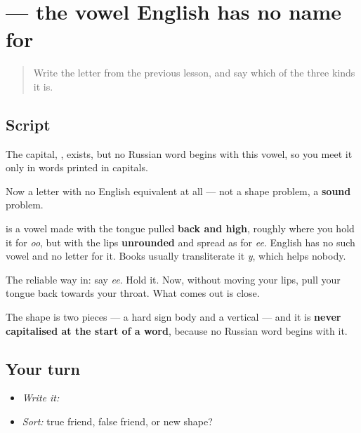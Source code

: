\section[\texorpdfstring{\ru{ы} (y)}{ы (y)}]{ — the vowel English has no name for}

\label{lesson:RU-W06-y}



\begin{quote}
Write the letter from the previous lesson, and say which of the three kinds it is.
\end{quote}

\subsection*{Script}

\begin{quote}
   
\end{quote}

The capital, \textbf{}, exists, but no Russian word begins with this vowel, so you meet it only in words printed in capitals.

Now a letter with no English equivalent at all — not a shape problem, a \textbf{sound} problem.

\textbf{} is a vowel made with the tongue pulled \textbf{back and high}, roughly where you hold it for \emph{oo}, but with the lips \textbf{unrounded} and spread as for \emph{ee}. English has no such vowel and no letter for it. Books usually transliterate it \emph{y}, which helps nobody.

The reliable way in: say \emph{ee}. Hold it. Now, without moving your lips, pull your tongue back towards your throat. What comes out is close.

The shape is two pieces — a hard sign body and a vertical — and it is \textbf{never capitalised at the start of a word}, because no Russian word begins with it.

\subsection*{Your turn}
\begin{itemize}
\raggedright
  \item \emph{Write it:} 
  \item \emph{Sort:} true friend, false friend, or new shape?
\end{itemize}

